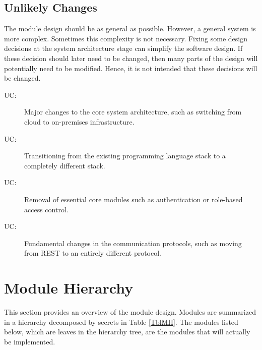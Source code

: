 \documentclass[12pt, titlepage]{article}
\newcounter{ucnum}
\newcommand{\uctheucnum}{UC\theucnum}
\begin{document}
\subsection{Unlikely Changes} \label{SecUchange}

The module design should be as general as possible. However, a general system is
more complex. Sometimes this complexity is not necessary. Fixing some design
decisions at the system architecture stage can simplify the software design. If
these decision should later need to be changed, then many parts of the design
will potentially need to be modified. Hence, it is not intended that these
decisions will be changed.

\begin{description}
\item[ \uctheucnum \label{ucArchitecture}:] Major changes to the core system architecture, such as switching from cloud to on-premises infrastructure.
\item[ \uctheucnum \label{ucLanguages}:] Transitioning from the existing programming language stack to a completely different stack.
\item[ \uctheucnum \label{ucCoreModules}:] Removal of essential core modules such as authentication or role-based access control.
\item[ \uctheucnum \label{ucProtocols}:] Fundamental changes in the communication protocols, such as moving from REST to an entirely different protocol.
\end{description}

\section{Module Hierarchy} \label{SecMH}

This section provides an overview of the module design. Modules are summarized
in a hierarchy decomposed by secrets in Table \ref{TblMH}. The modules listed
below, which are leaves in the hierarchy tree, are the modules that will
actually be implemented.
\end{document}
